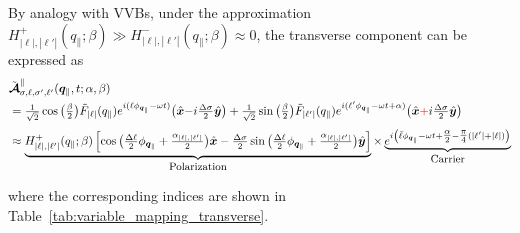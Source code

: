 \noindent
By analogy with VVBs, under the approximation $H_{|\ell|,|\ell'|}^+(q_\parallel; \beta) \gg H_{|\ell|,|\ell'|}^-(q_\parallel; \beta) \approx 0$, the transverse component can be expressed as
\begin{equation}
\label{transverse}
\begin{aligned}
&\tilde{\boldsymbol{\mathcal{A}}}_{\sigma,\ell,\sigma',\ell'}^{\parallel}(\boldsymbol{q}_{\|}, t; \alpha, \beta) \\
&= \tfrac{1}{\sqrt{2}} \cos \big( \tfrac{\beta}{2} \big) \tilde{F}_{|\ell|}(q_{\|}) e^{i(\ell\phi_{\boldsymbol{q}_{\|}} - \omega t)} \big( \hat{\boldsymbol{x}} \textcolor{red}{-} i \tfrac{\Delta\sigma}{2} \hat{\boldsymbol{y}} \big) + \tfrac{1}{\sqrt{2}} \sin \big( \tfrac{\beta}{2} \big) \tilde{F}_{|\ell'|}(q_{\|}) e^{i(\ell'\phi_{\boldsymbol{q}_{\|}} - \omega t + \alpha)}  \big( \hat{\boldsymbol{x}} \textcolor{red}{+} i \tfrac{\Delta\sigma}{2} \hat{\boldsymbol{y}} \big) \\[0.3em]
&\approx \underbrace{H_{|\ell|,|\ell'|}^{+}(q_{\|}; \beta) \left[ \cos \big( \tfrac{\Delta\ell}{2}\phi_{\boldsymbol{q}_{\|}} + \tfrac{\alpha_{|\ell|,|\ell'|}}{2} \big) \hat{\boldsymbol{x}} - \tfrac{\Delta\sigma}{2} \sin \big( \tfrac{\Delta\ell}{2}\phi_{\boldsymbol{q}_{\|}} + \tfrac{\alpha_{|\ell|,|\ell'|}}{2} \big) \hat{\boldsymbol{y}} \right]}_{\text{\small Polarization}} \times \underbrace{e^{i \left( \bar{\ell}\phi_{\boldsymbol{q}_{\|}}-\omega t + \tfrac{\alpha}{2} - \tfrac{\pi}{4}(|\ell'| + |\ell|) \right)}}_{\text{\small Carrier}}
\end{aligned}
\end{equation}

\noindent
where the corresponding indices are shown in Table~\ref{tab:variable_mapping_transverse}.

